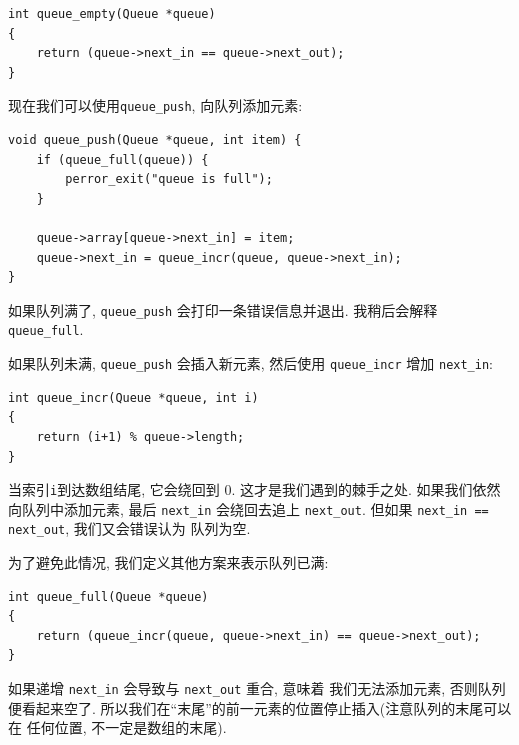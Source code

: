 \documentclass[12pt]{book}
\begin{document}
{\begin{verbatim}
int queue_empty(Queue *queue)
{
    return (queue->next_in == queue->next_out);
}
\end{verbatim}

现在我们可以使用\verb"queue_push", 向队列添加元素:

\begin{verbatim}
void queue_push(Queue *queue, int item) {
    if (queue_full(queue)) {
        perror_exit("queue is full");
    }
  
    queue->array[queue->next_in] = item;
    queue->next_in = queue_incr(queue, queue->next_in);
}
\end{verbatim}

如果队列满了,  \verb"queue_push" 会打印一条错误信息并退出.
我稍后会解释 \verb"queue_full".

如果队列未满, \verb"queue_push" 会插入新元素, 然后使用
\verb"queue_incr" 增加 \verb"next_in":

\begin{verbatim}
int queue_incr(Queue *queue, int i)
{
    return (i+1) % queue->length;
}
\end{verbatim}

当索引{\tt i}到达数组结尾, 它会绕回到 0. 这才是我们遇到的棘手之处. 
如果我们依然向队列中添加元素, 最后 \verb"next_in" 会绕回去追上
 \verb"next_out". 但如果 \verb"next_in == next_out",  我们又会错误认为
 队列为空. 

为了避免此情况, 我们定义其他方案来表示队列已满:

\begin{verbatim}
int queue_full(Queue *queue)
{
    return (queue_incr(queue, queue->next_in) == queue->next_out);
}
\end{verbatim}

如果递增 \verb"next_in" 会导致与  \verb"next_out" 重合, 意味着
我们无法添加元素, 否则队列便看起来空了. 
所以我们在``末尾''的前一元素的位置停止插入(注意队列的末尾可以在
任何位置, 不一定是数组的末尾).

}
\end{document}
